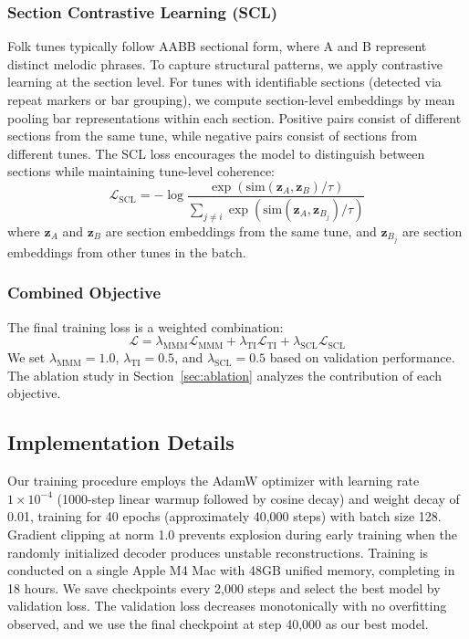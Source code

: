 \documentclass[]{interact}
\theoremstyle{plain}
\theoremstyle{definition}
\theoremstyle{remark}
\begin{document}
\subsubsection{Section Contrastive Learning (SCL)}

Folk tunes typically follow AABB sectional form, where A and B represent distinct melodic phrases. To capture structural patterns, we apply contrastive learning at the section level. For tunes with identifiable sections (detected via repeat markers or bar grouping), we compute section-level embeddings by mean pooling bar representations within each section. Positive pairs consist of different sections from the same tune, while negative pairs consist of sections from different tunes. The SCL loss encourages the model to distinguish between sections while maintaining tune-level coherence:
\begin{equation}
\mathcal{L}_{\text{SCL}} = -\log \frac{\exp(\text{sim}(\mathbf{z}_A, \mathbf{z}_B) / \tau)}{\sum_{j \neq i} \exp(\text{sim}(\mathbf{z}_A, \mathbf{z}_{B_j}) / \tau)}
\end{equation}
where $\mathbf{z}_A$ and $\mathbf{z}_B$ are section embeddings from the same tune, and $\mathbf{z}_{B_j}$ are section embeddings from other tunes in the batch.

\subsubsection{Combined Objective}

The final training loss is a weighted combination:
\begin{equation}
\mathcal{L} = \lambda_{\text{MMM}} \mathcal{L}_{\text{MMM}} + \lambda_{\text{TI}} \mathcal{L}_{\text{TI}} + \lambda_{\text{SCL}} \mathcal{L}_{\text{SCL}}
\end{equation}
We set $\lambda_{\text{MMM}} = 1.0$, $\lambda_{\text{TI}} = 0.5$, and $\lambda_{\text{SCL}} = 0.5$ based on validation performance. The ablation study in Section~\ref{sec:ablation} analyzes the contribution of each objective.

\subsection{Implementation Details}

Our training procedure employs the AdamW optimizer with learning rate $1 \times 10^{-4}$ (1000-step linear warmup followed by cosine decay) and weight decay of 0.01, training for 40 epochs (approximately 40,000 steps) with batch size 128. Gradient clipping at norm 1.0 prevents explosion during early training when the randomly initialized decoder produces unstable reconstructions. Training is conducted on a single Apple M4 Mac with 48GB unified memory, completing in 18 hours. We save checkpoints every 2,000 steps and select the best model by validation loss. The validation loss decreases monotonically with no overfitting observed, and we use the final checkpoint at step 40,000 as our best model.
\end{document}
